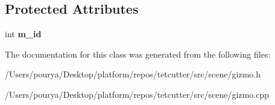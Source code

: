 \subsection*{Protected Attributes}
\begin{DoxyCompactItemize}
\item 
\hypertarget{classps_1_1scene_1_1IGizmoListener_af10f71e40619e8b82a6057616d0effdd}{}int {\bfseries m\+\_\+id}\label{classps_1_1scene_1_1IGizmoListener_af10f71e40619e8b82a6057616d0effdd}

\end{DoxyCompactItemize}


The documentation for this class was generated from the following files\+:\begin{DoxyCompactItemize}
\item 
/\+Users/pourya/\+Desktop/platform/repos/tetcutter/src/scene/gizmo.\+h\item 
/\+Users/pourya/\+Desktop/platform/repos/tetcutter/src/scene/gizmo.\+cpp\end{DoxyCompactItemize}
